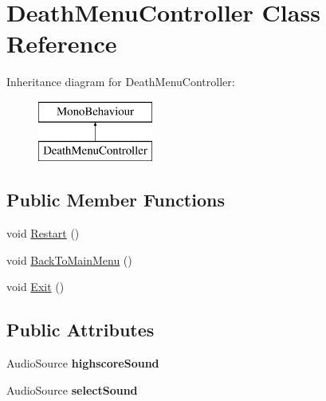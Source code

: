\hypertarget{class_death_menu_controller}{}\section{Death\+Menu\+Controller Class Reference}
\label{class_death_menu_controller}
Inheritance diagram for Death\+Menu\+Controller\+:\begin{figure}[H]
\begin{center}
\leavevmode
\includegraphics[height=2.000000cm]{class_death_menu_controller}
\end{center}
\end{figure}
\subsection*{Public Member Functions}
\begin{DoxyCompactItemize}
\item 
void \mbox{\hyperlink{class_death_menu_controller_a7197ffc2b2c7f828567305713273d337}{Restart}} ()
\item 
void \mbox{\hyperlink{class_death_menu_controller_ad80424d96e8421213c7f645d337c4bed}{Back\+To\+Main\+Menu}} ()
\item 
void \mbox{\hyperlink{class_death_menu_controller_a355e4d948743ca3d781e88f2f18315da}{Exit}} ()
\end{DoxyCompactItemize}
\subsection*{Public Attributes}
\begin{DoxyCompactItemize}
\item 
\mbox{\label{class_death_menu_controller_a010e57b3808602a044ca684c6ee8f1fa}} 
Audio\+Source {\bfseries highscore\+Sound}
\item 
\mbox{\label{class_death_menu_controller_a261c545ef587753229655b2a16fc6e1c}} 
Audio\+Source {\bfseries select\+Sound}
\end{DoxyCompactItemize}
